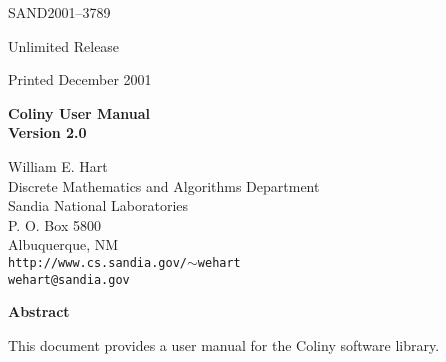 \documentclass[10pt]{article}
\begin{document}
\pagestyle{empty}
\setcounter{page}{2}


\begin{center}
SAND2001--3789

Unlimited Release

Printed December 2001
\end{center}

\vspace{0.8in}

\begin{center}
{\bf \LARGE Coliny User Manual\\[1ex]\Large Version 2.0}
\vspace*{0.4in}

William E. Hart\\
Discrete Mathematics and Algorithms Department\\
Sandia National Laboratories\\
P. O. Box 5800\\
Albuquerque, NM\\
{\tt http://www.cs.sandia.gov/$\sim$wehart}\\
{\tt wehart@sandia.gov}\\

\vspace*{1.0in}

{\bf\large Abstract}
\end{center}
This document provides a user manual for the Coliny software library.


\vfill
\newpage

\tableofcontents

\clearemptydoublepage
{}



\newpage


\newpage



\end{document}
